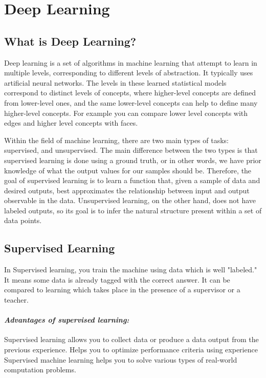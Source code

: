 
\chapter{Deep Learning\authorB}

\section{What is Deep Learning?}

Deep learning is a set of algorithms in machine
learning that attempt to learn in multiple levels, corresponding to different levels of abstraction. It typically uses artificial
neural networks. The levels in these learned statistical models
correspond to distinct levels of concepts, where higher-level concepts are defined from lower-level ones, and the same lower-level concepts can help to define many higher-level concepts. For example you can compare lower level concepts with edges and higher level concepts with faces. 

Within the field of machine learning, there are two main types of tasks: supervised, and unsupervised. The main difference between the two types is that supervised learning is done using a ground truth, or in other words, we have prior knowledge of what the output values for our samples should be. Therefore, the goal of supervised learning is to learn a function that, given a sample of data and desired outputs, best approximates the relationship between input and output observable in the data. Unsupervised learning, on the other hand, does not have labeled outputs, so its goal is to infer the natural structure present within a set of data points.  \cite{Goodfellow2015DeepL}

\section{Supervised Learning}

In Supervised learning, you train the machine using data which is well "labeled." It means some data is already tagged with the correct answer. It can be compared to learning which takes place in the presence of a supervisor or a teacher.

\subsubsection{\textit{Advantages of supervised learning:}}
Supervised learning allows you to collect data or produce a data output from the previous experience.
Helps you to optimize performance criteria using experience
Supervised machine learning helps you to solve various types of real-world computation problems. \cite{inbook}

